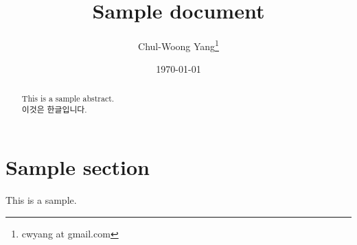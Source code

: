 \documentclass[11pt]{article}
\begin{document}
\title{Sample document}
\author{Chul-Woong Yang\thanks{cwyang at gmail.com}}
\date{\today}

\maketitle

\begin{abstract}
This is a sample abstract.\\
이것은 한글입니다.
\end{abstract}

\section{Sample section}
This is a sample\cite{Yang09Cache,Yang09Forest, Yang09Hash}.



\end{document}
